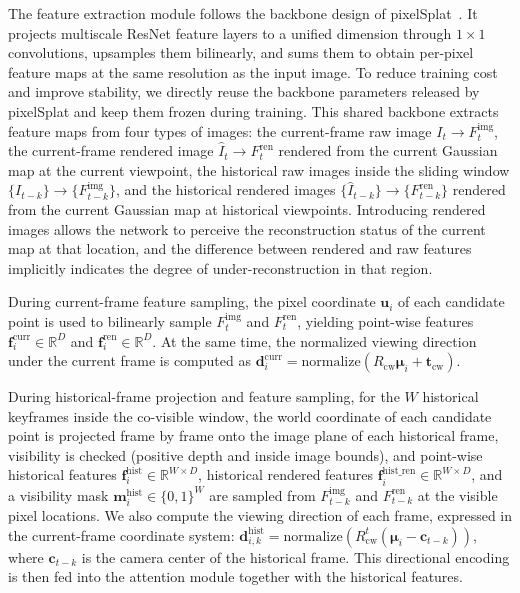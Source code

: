 \documentclass[lettersize,journal]{IEEEtran}
\begin{document}
The feature extraction module follows the backbone design of pixelSplat~\cite{charatan2024pixelsplat}. It projects multiscale ResNet feature layers to a unified dimension through $1 \times 1$ convolutions, upsamples them bilinearly, and sums them to obtain per-pixel feature maps at the same resolution as the input image. To reduce training cost and improve stability, we directly reuse the backbone parameters released by pixelSplat and keep them frozen during training. This shared backbone extracts feature maps from four types of images: the current-frame raw image $I_t \to F_t^{\text{img}}$, the current-frame rendered image $\hat{I}_t \to F_t^{\text{ren}}$ rendered from the current Gaussian map at the current viewpoint, the historical raw images inside the sliding window $\{I_{t-k}\} \to \{F_{t-k}^{\text{img}}\}$, and the historical rendered images $\{\hat{I}_{t-k}\} \to \{F_{t-k}^{\text{ren}}\}$ rendered from the current Gaussian map at historical viewpoints. Introducing rendered images allows the network to perceive the reconstruction status of the current map at that location, and the difference between rendered and raw features implicitly indicates the degree of under-reconstruction in that region.

During current-frame feature sampling, the pixel coordinate $\mathbf{u}_i$ of each candidate point is used to bilinearly sample $F_t^{\text{img}}$ and $F_t^{\text{ren}}$, yielding point-wise features $\mathbf{f}_i^{\text{curr}} \in \mathbb{R}^{D}$ and $\mathbf{f}_i^{\text{ren}} \in \mathbb{R}^{D}$. At the same time, the normalized viewing direction under the current frame is computed as $\mathbf{d}_i^{\text{curr}} = \text{normalize}(R_{\text{cw}} \boldsymbol{\mu}_i + \mathbf{t}_{\text{cw}})$.

During historical-frame projection and feature sampling, for the $W$ historical keyframes inside the co-visible window, the world coordinate of each candidate point is projected frame by frame onto the image plane of each historical frame, visibility is checked (positive depth and inside image bounds), and point-wise historical features $\mathbf{f}_i^{\text{hist}} \in \mathbb{R}^{W \times D}$, historical rendered features $\mathbf{f}_i^{\text{hist\_ren}} \in \mathbb{R}^{W \times D}$, and a visibility mask $\mathbf{m}_i^{\text{hist}} \in \{0,1\}^{W}$ are sampled from $F_{t-k}^{\text{img}}$ and $F_{t-k}^{\text{ren}}$ at the visible pixel locations. We also compute the viewing direction of each frame, expressed in the current-frame coordinate system: $\mathbf{d}_{i,k}^{\text{hist}} = \text{normalize}(R_{\text{cw}}^t (\boldsymbol{\mu}_i - \mathbf{c}_{t-k}))$, where $\mathbf{c}_{t-k}$ is the camera center of the historical frame. This directional encoding is then fed into the attention module together with the historical features.
\end{document}
